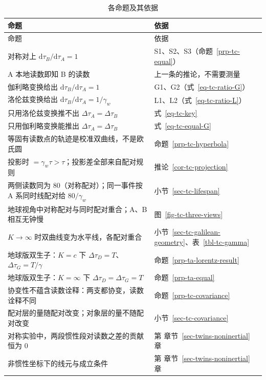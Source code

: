 \documentclass[
  chinese,
  a4paper,
  UTF8,
  12pt,
  oneside,
  openany]{ctexbook}
\theoremstyle{plain}
\theoremstyle{plain}
\theoremstyle{plain}
\theoremstyle{definition}
\theoremstyle{plain}
\theoremstyle{plain}
\theoremstyle{remark}
\begin{document}
\begin{longtable}[]{@{}
  >{\raggedright\arraybackslash}p{}
  >{\raggedright\arraybackslash}p{}@{}}
\caption{各命题及其依据}\label{tbl-tc-conclusion}\tabularnewline
\toprule\noalign{}
\begin{minipage}[b]{\linewidth}\raggedright
命题
\end{minipage} & \begin{minipage}[b]{\linewidth}\raggedright
依据
\end{minipage} \\
\midrule\noalign{}
\endfirsthead
\toprule\noalign{}
\begin{minipage}[b]{\linewidth}\raggedright
命题
\end{minipage} & \begin{minipage}[b]{\linewidth}\raggedright
依据
\end{minipage} \\
\midrule\noalign{}
\endhead
\bottomrule\noalign{}
\endlastfoot
对称对上 \(\mathrm{d}\tau_B/\mathrm{d}\tau_A=1\) &
S1、S2、S3（命题~\ref{prp-tc-equal}） \\
A 本地读数即知 B 的读数 & 上一条的推论，不需要测量 \\
伽利略变换给出 \(\mathrm{d}\tau_B/\mathrm{d}\tau_A=1\) &
G1、G2（式~\ref{eq-tc-ratio-G}） \\
洛伦兹变换给出 \(\mathrm{d}\tau_B/\mathrm{d}\tau_A=1/\gamma_w\) &
L1、L2（式~\ref{eq-tc-ratio-L}） \\
只用洛伦兹变换推不出 \(\Delta\tau_A=\Delta\tau_B\) &
式~\ref{eq-tc-key} \\
只用伽利略变换能推出 \(\Delta\tau_A=\Delta\tau_B\) &
式~\ref{eq-tc-equal-G} \\
等固有读数点的轨迹是校准双曲线，不是欧氏圆 &
命题~\ref{prp-tc-hyperbola} \\
投影时 \(=\gamma_w\tau>\tau\)；投影差全部来自配对规则 &
推论~\ref{cor-tc-projection} \\
两侧读数同为 \(80\)（对称配对）；同一事件按 A 系同时线配对给
\(80/\gamma_w\) & 小节~\ref{sec-tc-lifespan} \\
地球视角中对称配对与同时配对重合；A、B 相互无钟慢 &
图~\ref{fig-tc-three-views} \\
\(K\to\infty\) 时双曲线变为水平线，各配对重合 &
小节~\ref{sec-tc-galilean-geometry}、表~\ref{tbl-tc-gamma} \\
地球版双生子：\(K=c\) 下 \(\Delta\tau_D=T\)、\(\Delta\tau_G=T/\gamma\) &
命题~\ref{prp-ta-lorentz-result} \\
地球版双生子：\(K=\infty\) 下 \(\Delta\tau_D=\Delta\tau_G=T\) &
命题~\ref{prp-ta-equal} \\
协变性不蕴含读数诠释：两支都协变，读数诠释不同 &
命题~\ref{prp-tc-covariance} \\
配对层的量随配对改变；对象层的量不随配对改变 &
小节~\ref{sec-tc-covariance} \\
对称实验中，两段惯性段对读数之差的贡献恒为 \(0\) & 第
章节~\ref{sec-twins-noninertial} 章 \\
非惯性坐标下的线元与成立条件 & 第 章节~\ref{sec-twins-noninertial} 章 \\
\end{longtable}
\end{document}
